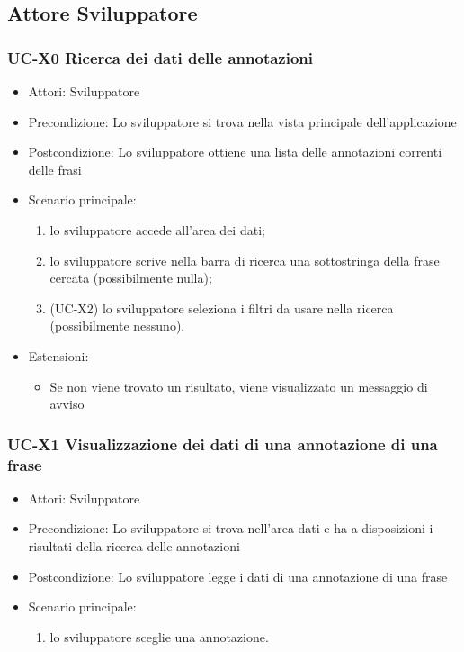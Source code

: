 \subsection{Attore Sviluppatore}

	\subsubsection{UC-X0 Ricerca dei dati delle annotazioni}
		\begin{itemize}
			\item Attori: Sviluppatore
			\item Precondizione: Lo sviluppatore si trova nella vista principale dell'applicazione
			\item Postcondizione: Lo sviluppatore ottiene una lista delle annotazioni correnti delle frasi
			\item Scenario principale:
				\begin{enumerate}
					\item lo sviluppatore accede all'area dei dati;
					\item lo sviluppatore scrive nella barra di ricerca una sottostringa della frase cercata (possibilmente nulla);
					\item (UC-X2) lo sviluppatore seleziona i filtri da usare nella ricerca (possibilmente nessuno).
				\end{enumerate}
			\item Estensioni:
				\begin{itemize}
					\item Se non viene trovato un risultato, viene visualizzato un messaggio di avviso
				\end{itemize}
		\end{itemize}

	\subsubsection{UC-X1 Visualizzazione dei dati di una annotazione di una frase}
		\begin{itemize}
			\item Attori: Sviluppatore
			\item Precondizione: Lo sviluppatore si trova nell'area dati e ha a disposizioni i risultati della ricerca delle annotazioni
			\item Postcondizione: Lo sviluppatore legge i dati di una annotazione di una frase
			\item Scenario principale:
				\begin{enumerate}
					\item lo sviluppatore sceglie una annotazione.
				\end{enumerate}
		\end{itemize}
	
